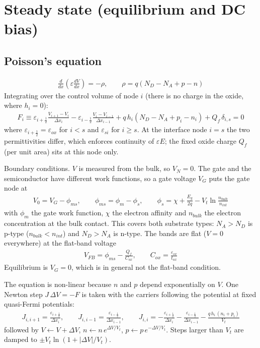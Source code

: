 \documentclass[11pt]{article}
\newcommand{\half}{\tfrac{1}{2}}
\begin{document}
\section{Steady state (equilibrium and DC bias)}
\subsection{Poisson's equation}
\begin{align}
\frac{d}{dx}\left(\varepsilon\frac{dV}{dx}\right) = -\rho, \qquad \rho = q\left(N_D-N_A+p-n\right)
\end{align}
Integrating over the control volume of node $i$ (there is no charge in the oxide, where $h_i=0$):
\begin{align}
F_i \equiv \varepsilon_{i+\half}\frac{V_{i+1}-V_i}{\Delta x_i}-\varepsilon_{i-\half}\frac{V_i-V_{i-1}}{\Delta x_{i-1}}
+q\,h_i\left(N_D-N_A+p_i-n_i\right)+Q_f\,\delta_{i,s}=0 \label{eq:poisson}
\end{align}
where $\varepsilon_{i+\half}=\varepsilon_{ox}$ for $i<s$ and $\varepsilon_{si}$ for $i\ge s$. At the interface
node $i=s$ the two permittivities differ, which enforces continuity of $\varepsilon E$; the fixed oxide
charge $Q_f$ (per unit area) sits at this node only.

Boundary conditions. $V$ is measured from the bulk, so $V_N=0$. The gate and the semiconductor have
different work functions, so a gate voltage $V_G$ puts the gate node at
\begin{align}
V_0=V_G-\phi_{ms},\qquad \phi_{ms}=\phi_m-\phi_s,\qquad
\phi_s=\chi+\frac{E_g}{2q}-V_t\ln\frac{n_{bulk}}{n_{int}}
\end{align}
with $\phi_m$ the gate work function, $\chi$ the electron affinity and $n_{bulk}$ the electron
concentration at the bulk contact. This covers both substrate types: $N_A>N_D$ is p-type
($n_{bulk}<n_{int}$) and $N_D>N_A$ is n-type. The bands are flat ($V=0$ everywhere) at the flat-band voltage
\begin{align}
V_{FB}=\phi_{ms}-\frac{Q_f}{C_{ox}},\qquad C_{ox}=\frac{\varepsilon_{ox}}{t_{ox}}
\end{align}
Equilibrium is $V_G=0$, which is in general not the flat-band condition.

The equation is non-linear because $n$ and $p$ depend exponentially on $V$. One Newton step
$J\,\Delta V=-F$ is taken with the carriers following the potential at fixed quasi-Fermi potentials:
\begin{align}
J_{i,i+1} = \frac{\varepsilon_{i+\half}}{\Delta x_{i}},\qquad J_{i,i-1} = \frac{\varepsilon_{i-\half}}{\Delta x_{i-1}},\qquad
J_{i,i} = -\frac{\varepsilon_{i+\half}}{\Delta x_i}-\frac{\varepsilon_{i-\half}}{\Delta x_{i-1}}-\frac{q\,h_i\,(n_i+p_i)}{V_t}
\end{align}
followed by $V\leftarrow V+\Delta V$, $n\leftarrow n\,e^{\Delta V/V_t}$, $p\leftarrow p\,e^{-\Delta V/V_t}$.
Steps larger than $V_t$ are damped to $\pm V_t\ln\!\left(1+|\Delta V|/V_t\right)$.
\end{document}

